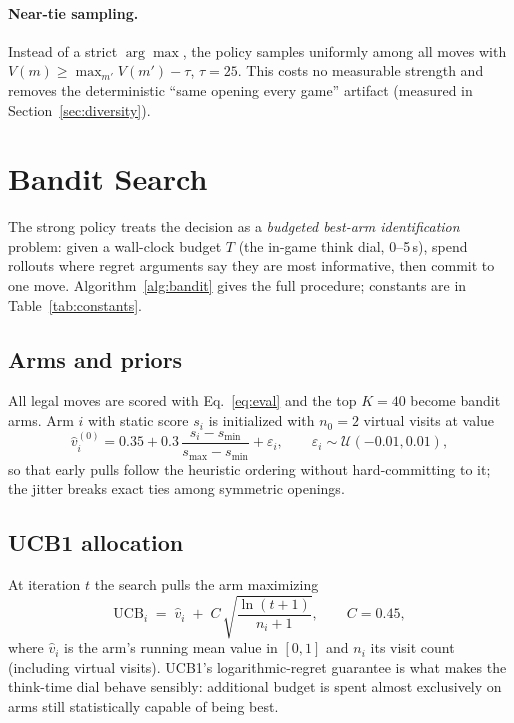 \documentclass[11pt]{article}
\begin{document}
\paragraph{Near-tie sampling.} Instead of a strict $\arg\max$, the policy
samples uniformly among all moves with
$V(m)\ge \max_{m'}V(m')-\tau$, $\tau=25$. This costs no measurable strength
and removes the deterministic ``same opening every game'' artifact (measured
in Section~\ref{sec:diversity}).

\section{Bandit Search}
\label{sec:bandit}

The strong policy treats the decision as a \emph{budgeted best-arm
identification} problem: given a wall-clock budget $T$ (the in-game think
dial, 0--5\,s), spend rollouts where regret arguments say they are most
informative, then commit to one move. Algorithm~\ref{alg:bandit} gives the
full procedure; constants are in Table~\ref{tab:constants}.

\subsection{Arms and priors}

All legal moves are scored with Eq.~\eqref{eq:eval} and the top
$K=40$ become bandit arms. Arm $i$ with static score $s_i$ is initialized
with $n_0=2$ virtual visits at value
\begin{equation}
\hat v_i^{(0)} = 0.35 + 0.3\,\frac{s_i - s_{\min}}{s_{\max}-s_{\min}} + \varepsilon_i,
\qquad \varepsilon_i \sim \mathcal{U}(-0.01, 0.01),
\end{equation}
so that early pulls follow the heuristic ordering without hard-committing to
it; the jitter breaks exact ties among symmetric openings.

\subsection{UCB1 allocation}

At iteration $t$ the search pulls the arm maximizing
\begin{equation}
\mathrm{UCB}_i \;=\; \hat v_i \;+\; C\,\sqrt{\frac{\ln (t+1)}{n_i+1}},
\qquad C = 0.45,
\end{equation}
where $\hat v_i$ is the arm's running mean value in $[0,1]$ and $n_i$ its
visit count (including virtual visits). UCB1's logarithmic-regret guarantee
\cite{auer2002} is what makes the think-time dial behave sensibly: additional
budget is spent almost exclusively on arms still statistically capable of
being best.
\end{document}
